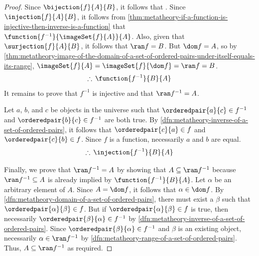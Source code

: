 \begin{proof}
    Since \( \bijection{f}{A}{B} \), it follows that .
    Since \( \injection{f}{A}{B} \), it follows from \cref{thm:metatheory-if-a-function-is-injective-then-inverse-is-a-function} that
    \( \function{f^{-1}}{\imageSet{f}{A}}{A} \).
    Also, given that \( \surjection{f}{A}{B} \), it follows that \( \ran f = B \).
    But \( \dom f = A \), so by \cref{thm:metatheory-image-of-the-domain-of-a-set-of-ordered-pairs-under-itself-equals-its-range},
    \( \imageSet{f}{A} = \imageSet{f}{\dom f} = \ran f = B \).
    \begin{equation*}
        \therefore \, \function{f^{-1}}{B}{A}
    \end{equation*}
    It remains to prove that \( f^{-1} \) is injective and that \( \ran f^{-1} = A \).

    \vspace{0.3cm}
    \noindent
    Let \( a \), \( b \), and \( c \) be objects in the universe such that \( \orderedpair{a}{c} \in f^{-1} \) and \( \orderedpair{b}{c} \in f^{-1} \)
    are both true.
    By \cref{dfn:metatheory-inverse-of-a-set-of-ordered-pairs}, it follows that \( \orderedpair{c}{a} \in f \) and \( \orderedpair{c}{b} \in f \).
    Since \( f \) is a function, necessarily \( a \) and \( b \) are equal.
    \begin{equation*}
        \therefore \, \injection{f^{-1}}{B}{A}
    \end{equation*}

    \vspace{0.3cm}
    \noindent
    Finally, we prove that \( \ran f^{-1} = A \) by showing that \( A \subseteq \ran f^{-1} \) because \( \ran f^{-1} \subseteq A \) is already implied by
    \( \function{f^{-1}}{B}{A} \).
    Let \( \alpha \) be an arbitrary element of \( A \). Since \( A = \dom f \), it follows that \( \alpha \in \dom f \).
    By \cref{dfn:metatheory-domain-of-a-set-of-ordered-pairs}, there must exist a \( \beta \) such that \( \orderedpair{\alpha}{\beta} \in f \).
    But if \( \orderedpair{\alpha}{\beta} \in f \) is true, then necessarily \( \orderedpair{\beta}{\alpha} \in f^{-1} \) by \cref{dfn:metatheory-inverse-of-a-set-of-ordered-pairs}.
    Since \( \orderedpair{\beta}{\alpha} \in f^{-1} \) and \( \beta \) is an existing object, necessarily \( \alpha \in \ran f^{-1} \) by
    \cref{dfn:metatheory-range-of-a-set-of-ordered-pairs}.
    Thus, \( A \subseteq \ran f^{-1} \) as required.
\end{proof}

